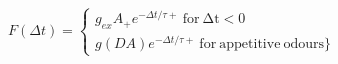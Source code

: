  $F(\Delta t) =  \begin{cases} g_{ex}A_{+} e^{−\Delta t/τ+}\:\mathrm{for\:\Delta t <0}\\g(DA) e^{−\Delta t/τ+}\:\mathrm{for\:appetitive\:odours}\} \end{cases}$
 